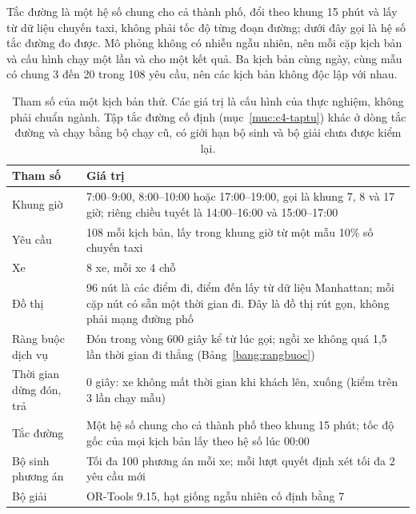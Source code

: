 Tắc đường là một hệ số chung cho cả thành phố, đổi theo khung 15 phút và lấy từ dữ liệu chuyến taxi, không phải tốc độ
từng đoạn đường; dưới đây gọi là hệ số tắc đường đo được. Mô phỏng không có nhiễu ngẫu nhiên, nên mỗi cặp
kịch bản và cấu hình chạy một lần và cho một kết quả. Ba kịch bản cùng ngày, cùng mẫu có chung 3 đến 20 trong 108 yêu
cầu, nên các kịch bản không độc lập với nhau.

\begin{table}[htbp]
\centering
\caption[Tham số của một kịch bản thử]{Tham số của một kịch bản thử. Các giá trị là cấu hình của thực nghiệm, không phải chuẩn ngành. Tập tắc
đường cố định (mục~\ref{muc:c4-taptu}) khác ở dòng tắc đường và chạy bằng bộ chạy cũ, có giới hạn bộ sinh và bộ
giải chưa được kiểm lại.}
\label{bang:c4-thamso}
\small
\begin{tabular}{@{}p{4.0cm}p{11.0cm}@{}}
\toprule
\textbf{Tham số} & \textbf{Giá trị}\\
\midrule
Khung giờ & 7:00--9:00, 8:00--10:00 hoặc 17:00--19:00, gọi là khung 7, 8 và 17 giờ; riêng chiều tuyết
là 14:00--16:00 và 15:00--17:00\\
Yêu cầu & 108 mỗi kịch bản, lấy trong khung giờ từ một mẫu 10\% số chuyến taxi\\
Xe & 8 xe, mỗi xe 4 chỗ\\
Đồ thị & 96 nút là các điểm đi, điểm đến lấy từ dữ liệu Manhattan; mỗi cặp nút có sẵn một thời gian đi. Đây là
đồ thị rút gọn, không phải mạng đường phố\\
Ràng buộc dịch vụ & Đón trong vòng 600 giây kể từ lúc gọi; ngồi xe không quá 1,5 lần thời gian đi
thẳng (Bảng~\ref{bang:rangbuoc})\\
Thời gian dừng đón, trả & 0 giây: xe không mất thời gian khi khách lên, xuống (kiểm trên 3 lần chạy mẫu)\\
Tắc đường & Một hệ số chung cho cả thành phố theo khung 15 phút; tốc độ gốc của mọi kịch bản lấy theo hệ số lúc
00:00\\
Bộ sinh phương án & Tối đa 100 phương án mỗi xe; mỗi lượt quyết định xét tối đa 2 yêu cầu mới\\
Bộ giải & OR-Tools 9.15, hạt giống ngẫu nhiên cố định bằng 7\\
\bottomrule
\end{tabular}
\end{table}

